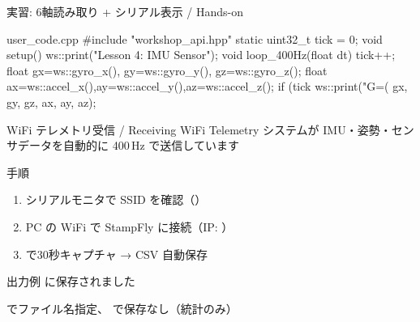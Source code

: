 \begin{frame}[fragile]{実習: 6軸読み取り + シリアル表示 / Hands-on}
  \begin{sflisting}[basicstyle=\ttfamily\scriptsize]{user\_code.cpp}
#include "workshop_api.hpp"
static uint32_t tick = 0;
void setup() { ws::print("Lesson 4: IMU Sensor"); }
void loop_400Hz(float dt) {
    tick++;
    float gx=ws::gyro_x(), gy=ws::gyro_y(), gz=ws::gyro_z();
    float ax=ws::accel_x(),ay=ws::accel_y(),az=ws::accel_z();
    if (tick %
        ws::print("G=(%
                  gx, gy, gz, ax, ay, az);
}
  \end{sflisting}
\end{frame}

\begin{frame}{WiFi テレメトリ受信 / Receiving WiFi Telemetry}
  {\small システムが IMU・姿勢・センサデータを自動的に 400\,Hz で送信しています}
  \vspace{0.3em}
  \begin{block}{手順}
    \begin{enumerate}
      \item シリアルモニタで SSID を確認（）
      \item PC の WiFi で StampFly に接続（IP: ）
      \item {} で30秒キャプチャ → CSV 自動保存
    \end{enumerate}
  \end{block}

  \vspace{0.5em}

  \begin{exampleblock}{出力例}
     に保存されました
  \end{exampleblock}

  \vspace{0.3em}
  {\small
   でファイル名指定、 で保存なし（統計のみ）
  }
\end{frame}

